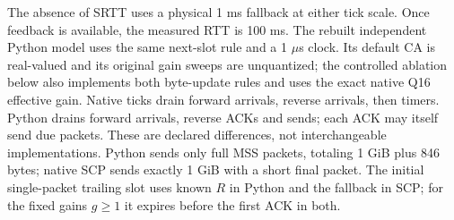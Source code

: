 \documentclass[sigconf,nonacm]{acmart}
\begin{document}
The absence of SRTT uses a physical 1 ms fallback at either tick scale. Once feedback is available, the measured RTT is 100 ms. The rebuilt independent Python model uses the same next-slot rule and a 1 $\mu$s clock. Its default CA is real-valued and its original gain sweeps are unquantized; the controlled ablation below also implements both byte-update rules and uses the exact native Q16 effective gain. Native ticks drain forward arrivals, reverse arrivals, then timers. Python drains forward arrivals, reverse ACKs and sends; each ACK may itself send due packets. These are declared differences, not interchangeable implementations. Python sends only full MSS packets, totaling 1 GiB plus 846 bytes; native SCP sends exactly 1 GiB with a short final packet. The initial single-packet trailing slot uses known $R$ in Python and the fallback in SCP; for the fixed gains $g\ge1$ it expires before the first ACK in both.
\end{document}
